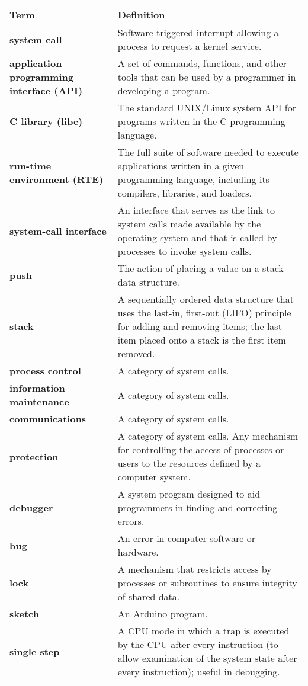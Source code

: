 \begin{tabular}{>{\raggedright}p{} >{\raggedright\arraybackslash}p{}}
\toprule
\textbf{Term} & \textbf{Definition} \\
\midrule
\textbf{system call} & Software-triggered interrupt allowing a process to request a kernel service. \\
\textbf{application programming interface (API)} & A set of commands, functions, and other tools that can be used by a programmer in developing a program. \\
\textbf{C library (libc)} & The standard UNIX/Linux system API for programs written in the C programming language. \\
\textbf{run-time environment (RTE)} & The full suite of software needed to execute applications written in a given programming language, including its compilers, libraries, and loaders. \\
\textbf{system-call interface} & An interface that serves as the link to system calls made available by the operating system and that is called by processes to invoke system calls. \\
\textbf{push} & The action of placing a value on a stack data structure. \\
\textbf{stack} & A sequentially ordered data structure that uses the last-in, first-out (LIFO) principle for adding and removing items; the last item placed onto a stack is the first item removed. \\
\textbf{process control} & A category of system calls. \\
\textbf{information maintenance} & A category of system calls. \\
\textbf{communications} & A category of system calls. \\
\textbf{protection} & A category of system calls. Any mechanism for controlling the access of processes or users to the resources defined by a computer system. \\
\textbf{debugger} & A system program designed to aid programmers in finding and correcting errors. \\
\textbf{bug} & An error in computer software or hardware. \\
\textbf{lock} & A mechanism that restricts access by processes or subroutines to ensure integrity of shared data. \\
\textbf{sketch} & An Arduino program. \\
\textbf{single step} & A CPU mode in which a trap is executed by the CPU after every instruction (to allow examination of the system state after every instruction); useful in debugging. \\

\end{tabular}
